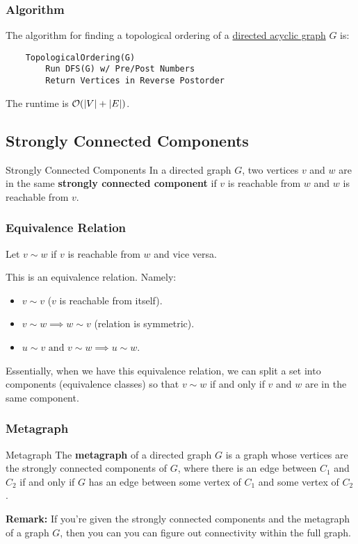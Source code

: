 \documentclass[letterpaper]{article}
\begin{document}
\subsubsection{Algorithm}
The algorithm for finding a topological ordering of a \underline{directed acyclic graph} $G$ is:
\begin{verbatim}
    TopologicalOrdering(G)
        Run DFS(G) w/ Pre/Post Numbers 
        Return Vertices in Reverse Postorder
\end{verbatim}
The runtime is $\mathcal{O}(|V| + |E|)$. 

\subsection{Strongly Connected Components}
\begin{definition}{Strongly Connected Components}{}
    In a directed graph $G$, two vertices $v$ and $w$ are in the same \textbf{strongly connected component} if $v$ is reachable from $w$ and $w$ is reachable from $v$.
\end{definition}

\subsubsection{Equivalence Relation}
Let $v \sim w$ if $v$ is reachable from $w$ and vice versa.
\begin{proposition}
    This is an equivalence relation. Namely:
    \begin{itemize}
        \item $v \sim v$ ($v$ is reachable from itself).
        \item $v \sim w \implies w \sim v$ (relation is symmetric).
        \item $u \sim v \text{ and } v \sim w \implies u \sim w$.
    \end{itemize}
\end{proposition}

Essentially, when we have this equivalence relation, we can split a set into components (equivalence classes) so that $v \sim w$ if and only if $v$ and $w$ are in the same component.

\subsubsection{Metagraph}
\begin{definition}{Metagraph}{}
    The \textbf{metagraph} of a directed graph $G$ is a graph whose vertices are the strongly connected components of $G$, where there is an edge between $C_1$ and $C_2$ if and only if $G$ has an edge between some vertex of $C_1$ and some vertex of $C_2$. 
\end{definition}
\textbf{Remark:} If you're given the strongly connected components and the metagraph of a graph $G$, then you can you can figure out connectivity within the full graph.
\end{document}
